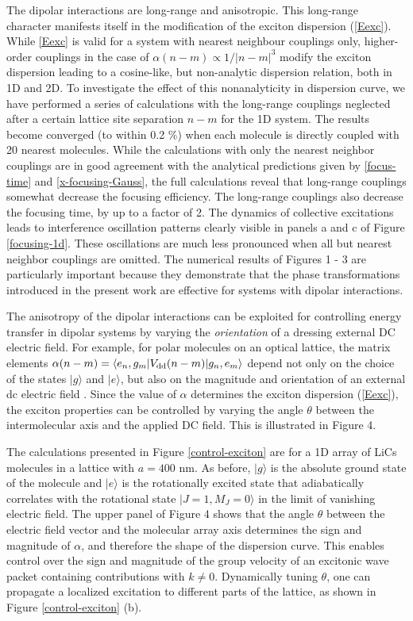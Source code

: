 The dipolar interactions are long-range and anisotropic. This long-range character
manifests itself in the modification of the exciton dispersion (\ref{Eexc}). While \autoref{Eexc} is valid for a system 
with nearest neighbour couplings only, higher-order couplings in the case of $\alpha(n-m) \propto 1/ |n-m|^3$ 
modify the exciton dispersion leading to a cosine-like, 
but non-analytic dispersion relation, both in 1D  and 2D. 
To investigate the effect of this nonanalyticity in dispersion curve, we have performed a series of calculations with the long-range couplings neglected 
after a certain lattice site separation $n-m$ for the 1D system. The results become  converged (to within 0.2 \%) when
 each molecule is directly coupled with 20 nearest molecules. While the calculations with only the nearest neighbor
 couplings are in good agreement  with the analytical predictions given by \autoref{focus-time} and \autoref{x-focusing-Gauss}, the full calculations reveal that long-range 
couplings somewhat decrease the focusing efficiency. The long-range couplings also decrease the focusing time, 
by up to a factor of 2. The dynamics of collective excitations leads to interference oscillation patterns clearly 
visible in panels a and c of Figure \ref{focusing-1d}. These oscillations are much less pronounced when all but nearest
 neighbor couplings are omitted. The numerical results of Figures 1 - 3 are particularly important
 because they demonstrate that the phase transformations introduced in the present work are effective  for 
systems with dipolar interactions. 


The anisotropy of the dipolar interactions can be exploited for controlling energy transfer in dipolar systems by varying the {\it orientation} of a dressing external DC electric field. 
For example,  for polar molecules on an optical lattice,  
the matrix elements  $\alpha(n-m) = \langle e_{n} , g_{m} | {V}_{\rm dd}(n-m) | g_{n}, e_{m} \rangle$ depend not only on the choice of
 the states $|g\rangle$ and $|e\rangle$, but also on the magnitude and orientation of an external dc electric field
\cite{biexcitons, felipe}. Since the value of $\alpha$ determines the exciton dispersion (\ref{Eexc}),
 the exciton properties can be controlled by varying the angle $\theta$ between the intermolecular axis
and the applied DC field. This is illustrated in Figure 4. 

The calculations presented in Figure \ref{control-exciton} are for a 1D array of LiCs molecules in a lattice with  $a=400$ nm.
As before, $|g\rangle$ is the absolute ground state of the molecule and $|e\rangle$ is the rotationally excited state
 that adiabatically correlates
with the rotational state $|J=1, M_J = 0 \rangle$ in the limit of vanishing electric field. 
The upper panel of Figure 4
shows that the angle $\theta$ between the electric field vector and the molecular array axis
determines the sign and magnitude of $\alpha$, and therefore the shape of the dispersion
curve. This enables
control over the sign and magnitude of the group velocity of an
excitonic wave packet containing contributions with $k\neq 0$. Dynamically tuning $\theta$,
one can propagate a localized excitation to different parts of the
lattice, as shown in Figure \ref{control-exciton} (b).

